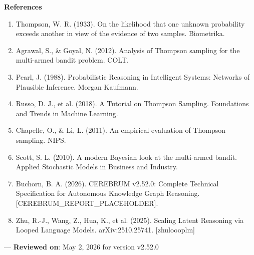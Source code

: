 \textbf{References}
\begin{enumerate}
\item Thompson, W. R. (1933). On the likelihood that one unknown probability exceeds another in view of the evidence of two samples. Biometrika.
\item Agrawal, S., \& Goyal, N. (2012). Analysis of Thompson sampling for the multi-armed bandit problem. COLT.
\item Pearl, J. (1988). Probab\-ilistic Reasoning in Intelligent Systems: Networks of Plausible Inference. Morgan Kaufmann.
\item Russo, D. J., et al. (2018). A Tutorial on Thompson Sampling. Foundations and Trends in Machine Learning.
\item Chapelle, O., \& Li, L. (2011). An empirical evaluation of Thompson sampling. NIPS.
\item Scott, S. L. (2010). A modern Bayesian look at the multi-armed bandit. Applied Stochastic Models in Business and Industry.
\item Buchorn, B. A. (2026). CEREBRUM v2.52.0: Complete Technical Specif\-ication for Autonomous Knowledge Graph Reasoning. [CEREBRUM\_REPORT\_PLACEHOLDER].
\item Zhu, R.-J., Wang, Z., Hua, K., et al. (2025). Scaling Latent Reasoning via Looped Language Models. arXiv:2510.25741. [zhu\-loooplm]

\end{enumerate}
---
\textbf{Reviewed on}: May 2, 2026 for version v2.52.0
